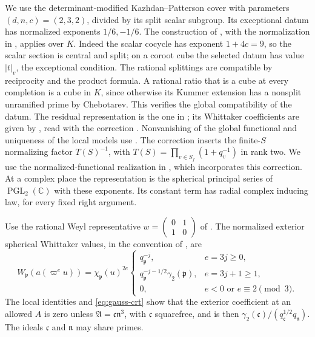 \documentclass[11pt,a4paper]{article}
\numberwithin{equation}{section}
\theoremstyle{definition}
\theoremstyle{remark}
\begin{document}
We use the determinant-modified Kazhdan--Patterson cover with parameters
$(d,n,c)=(2,3,2)$, divided by its split scalar subgroup.  Its exceptional
datum has normalized exponents $1/6,-1/6$.  The construction of \cite{KP},
with the normalization in \cite[Proposition~5.1 and Appendix~A]{P},
applies over $K$.  Indeed the scalar cocycle has exponent
$1+4c=9$, so the scalar section is central and split; on a coroot cube
the selected datum has value $|t|_v$, the exceptional condition.
The rational splittings are compatible by reciprocity and the product
formula.  A rational ratio that is a cube at every completion is a cube
in $K$, since otherwise its Kummer extension has a nonsplit unramified
prime by Chebotarev.  This verifies the global compatibility of the
datum.  The residual representation is the one in
\cite[Theorem~II.2.1]{KP}; its Whittaker coefficients are given by
\cite[Theorem~II.2.2]{KP}, read with the correction \cite{KPcorr}.
Nonvanishing of the global functional and uniqueness of the local
models use \cite[Theorem~II.2.5(a),(b)]{KP}.
The correction inserts the finite-$S$ normalizing factor $T(S)^{-1}$,
with
$T(S)=\prod_{v\in S_f}(1+q_v^{-1})$ in rank two.
We use the normalized-functional realization in
\cite[Appendix~A.2]{P}, which incorporates this correction.
At a complex place the representation is the spherical principal series
of $\operatorname{PGL}_2(\mathbb C)$ with these exponents.  Its constant
term has radial complex inducing law, for every fixed right argument.

Use the rational Weyl representative
$w=\left(\begin{smallmatrix}0&1\\1&0\end{smallmatrix}\right)$ of
\cite[Section~6.1]{P}.  The normalized exterior spherical Whittaker values,
in the convention of \cite[Proposition~5.1(ii)]{P}, are
\begin{equation}\label{eq:theta-spherical-values}
 W_{\mathfrak p}(a(\varpi^e u))=\chi_{\mathfrak p}(u)^{2e}
 \begin{cases}
 q_{\mathfrak p}^{-j},&e=3j\ge0,\\
 q_{\mathfrak p}^{-j-1/2}\gamma_2(\mathfrak p),&e=3j+1\ge1,\\
 0,&e<0\text{ or }e\equiv2\pmod3.
 \end{cases}
\end{equation}
The local identities and \eqref{eq:gauss-crt} show that the exterior
coefficient at an allowed $A$ is zero unless
$\mathfrak A=\mathfrak c\mathfrak n^3$, with $\mathfrak c$ squarefree,
and is then $\gamma_2(\mathfrak c)/(q_{\mathfrak c}^{1/2}q_{\mathfrak n})$.
The ideals $\mathfrak c$ and $\mathfrak n$ may share primes.
\end{document}
